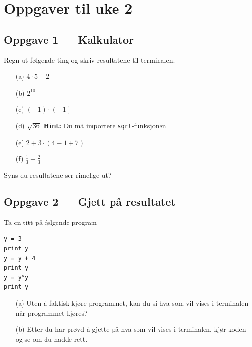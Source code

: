 \documentclass[a4paper, 11pt, notitlepage]{article}
\begin{document}
\clearpage

\section*{Oppgaver til uke 2}

\subsection*{Oppgave 1 --- Kalkulator}
Regn ut følgende ting og skriv resultatene til terminalen.
	\begin{itemize}
		\item[(a)] $4\cdot5+2$
		\item[(b)] $2^{10} $
		\item[(c)] $(-1)\cdot(-1)$
		\item[(d)] $\sqrt{36}$ \hspace{1cm} \textbf{Hint:} Du må importere \verb+sqrt+-funksjonen
		\item[(e)] $2 + 3\cdot(4-1+7)$
		\item[(f)] $\frac{1}{3} + \frac{2}{3}$
	\end{itemize}
Syns du resultatene ser rimelige ut?

\subsection*{Oppgave 2 --- Gjett på resultatet}
Ta en titt på følgende program
\begin{lstlisting}
y = 3
print y 
y = y + 4
print y 
y = y*y 
print y
\end{lstlisting}
\begin{itemize}
	\item[(a)] Uten å faktisk kjøre programmet, kan du si hva som vil vises i terminalen når programmet kjøres?
	\item[(b)] Etter du har prøvd å gjette på hva som vil vises i terminalen, kjør koden og se om du hadde rett.
\end{itemize}
\end{document}
